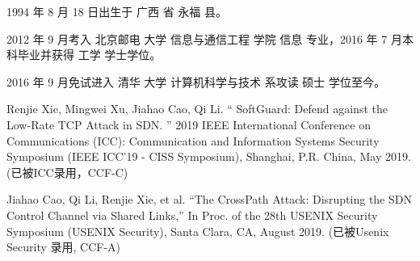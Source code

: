 \begin{resume}


  1994 年 8 月 18 日出生于 广西 省 永福 县。

  2012 年 9 月考入 北京邮电 大学 信息与通信工程 学院 信息 专业，2016 年 7 月本科毕业并获得 工学 学士学位。

  2016 年 9 月免试进入 清华 大学 计算机科学与技术 系攻读 硕士 学位至今。



  \begin{publications}[before=\publicationskip,after=\publicationskip]

    \item Renjie Xie, Mingwei Xu, Jiahao Cao, Qi Li. “ SoftGuard: Defend against the Low-Rate TCP Attack in SDN. ” 2019 IEEE International Conference on Communications (ICC): Communication and Information Systems Security Symposium (IEEE ICC'19 - CISS Symposium), Shanghai, P.R. China, May 2019. (已被ICC录用，CCF-C)

    
    
  \end{publications}

  \begin{publications}
    \item Jiahao Cao, Qi Li, Renjie Xie, et al. “The CrossPath Attack: Disrupting the SDN Control Channel via Shared Links,” In Proc. of the 28th USENIX Security Symposium (USENIX Security), Santa Clara, CA, August 2019.  (已被Usenix Security 录用, CCF-A)
  \end{publications}


\end{resume}
